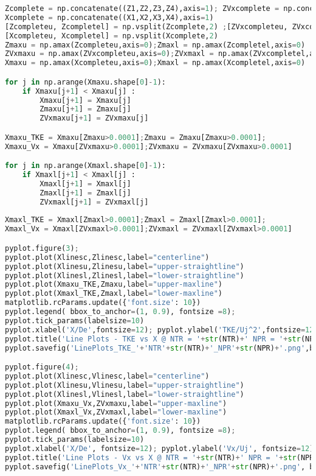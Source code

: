 \begin{lstlisting}[language=Python]
Zcomplete = np.concatenate((Z1,Z2,Z3,Z4),axis=1); ZVxcomplete = np.concatenate((ZVx1,ZVx2,ZVx3,ZVx4),axis=1)
Xcomplete = np.concatenate((X1,X2,X3,X4),axis=1)
[Zcompleteu, Zcompletel] = np.vsplit(Zcomplete,2) ;[ZVxcompleteu, ZVxcompletel] = np.vsplit(ZVxcomplete,2)
[Xcompleteu, Xcompletel] = np.vsplit(Xcomplete,2)
Zmaxu = np.amax(Zcompleteu,axis=0);Zmaxl = np.amax(Zcompletel,axis=0)
ZVxmaxu = np.amax(ZVxcompleteu,axis=0);ZVxmaxl = np.amax(ZVxcompletel,axis=0)
Xmaxu = np.amax(Xcompleteu,axis=0);Xmaxl = np.amax(Xcompletel,axis=0)

for j in np.arange(Xmaxu.shape[0]-1):
    if Xmaxu[j+1] < Xmaxu[j] :
        Xmaxu[j+1] = Xmaxu[j]
        Zmaxu[j+1] = Zmaxu[j] 
        ZVxmaxu[j+1] = ZVxmaxu[j] 

Xmaxu_TKE = Xmaxu[Zmaxu>0.0001];Zmaxu = Zmaxu[Zmaxu>0.0001];
Xmaxu_Vx = Xmaxu[ZVxmaxu>0.0001];ZVxmaxu = ZVxmaxu[ZVxmaxu>0.0001]

for j in np.arange(Xmaxl.shape[0]-1):
    if Xmaxl[j+1] < Xmaxl[j] :
        Xmaxl[j+1] = Xmaxl[j]
        Zmaxl[j+1] = Zmaxl[j] 
        ZVxmaxl[j+1] = ZVxmaxl[j] 
        
Xmaxl_TKE = Xmaxl[Zmaxl>0.0001];Zmaxl = Zmaxl[Zmaxl>0.0001];
Xmaxl_Vx = Xmaxl[ZVxmaxl>0.0001];ZVxmaxl = ZVxmaxl[ZVxmaxl>0.0001]

pyplot.figure(3);
pyplot.plot(Xlinesc,Zlinesc,label="centerline") 
pyplot.plot(Xlinesu,Zlinesu,label="upper-straightline") 
pyplot.plot(Xlinesl,Zlinesl,label="lower-straightline") 
pyplot.plot(Xmaxu_TKE,Zmaxu,label="upper-maxline")
pyplot.plot(Xmaxl_TKE,Zmaxl,label="lower-maxline")
matplotlib.rcParams.update({'font.size': 10})
pyplot.legend( bbox_to_anchor=(1, 0.9), fontsize =8); 
pyplot.tick_params(labelsize=10)
pyplot.xlabel('X/De',fontsize=12); pyplot.ylabel('TKE/Uj^2',fontsize=12)    
pyplot.title('Line Plots - TKE vs X @ NTR = '+str(NTR)+' NPR = '+str(NPR), y = 1.02,fontsize=14)
pyplot.savefig('LinePlots_TKE_'+'NTR'+str(NTR)+'_NPR'+str(NPR)+'.png',bbox_inches='tight',  dpi=300)

pyplot.figure(4);
pyplot.plot(Xlinesc,Vlinesc,label="centerline")
pyplot.plot(Xlinesu,Vlinesu,label="upper-straightline")  
pyplot.plot(Xlinesl,Vlinesl,label="lower-straightline")  
pyplot.plot(Xmaxu_Vx,ZVxmaxu,label="upper-maxline")
pyplot.plot(Xmaxl_Vx,ZVxmaxl,label="lower-maxline")   
matplotlib.rcParams.update({'font.size': 10})
pyplot.legend( bbox_to_anchor=(1, 0.9), fontsize =8); 
pyplot.tick_params(labelsize=10)
pyplot.xlabel('X/De', fontsize=12); pyplot.ylabel('Vx/Uj', fontsize=12)    
pyplot.title('Line Plots - Vx vs X @ NTR = '+str(NTR)+' NPR = '+str(NPR), y = 1.02, fontsize=14)
pyplot.savefig('LinePlots_Vx_'+'NTR'+str(NTR)+'_NPR'+str(NPR)+'.png', bbox_inches='tight', dpi=300)
   

\end{lstlisting}
